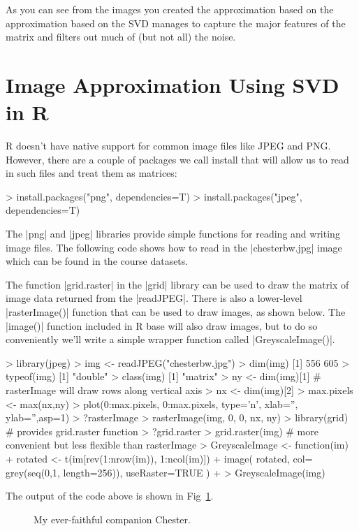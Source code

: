 As you can see from the images you created the approximation based on the approximation based on the SVD manages to capture the major features of the matrix and filters out much of (but not all) the noise.

\section{Image Approximation Using SVD in R}

R doesn't have native support for common image files like JPEG and PNG.  However, there are a couple of packages we call install that will allow us to read in such files and treat them as matrices:
%
\begin{R}
> install.packages("png", dependencies=T)
> install.packages("jpeg", dependencies=T)
\end{R}

The |png| and |jpeg| libraries provide simple functions for reading and writing image files.  The following code shows how to read in the |chesterbw.jpg| image which can be found in the course datasets. %


The function |grid.raster| in the |grid| library can be used to draw the matrix of image data returned from the |readJPEG|.  There is also a lower-level |rasterImage()| function that can be used to draw images, as shown below. The |image()| function included in R base will also draw images, but to do so conveniently we'll write a simple wrapper function called |GreyscaleImage()|.

%
\begin{R}
> library(jpeg)
> img <- readJPEG("chesterbw.jpg")
> dim(img)
[1] 556 605
> typeof(img)
[1] "double"
> class(img)
[1] "matrix"
> ny <- dim(img)[1]  # rasterImage will draw rows along vertical axis
> nx <- dim(img)[2]
> max.pixels <- max(nx,ny)
> plot(0:max.pixels, 0:max.pixels, type='n', xlab='', ylab='',asp=1)
> ?rasterImage
> rasterImage(img, 0, 0, nx, ny)
> library(grid) # provides grid.raster function
> ?grid.raster
> grid.raster(img)  # more convenient but less flexible than rasterImage
> GreyscaleImage <- function(im){
+    rotated <- t(im[rev(1:nrow(im)), 1:ncol(im)])
+    image( rotated, col= grey(seq(0,1, length=256)), useRaster=TRUE )
+ }
> GreyscaleImage(img)
\end{R}
The output of the code above is shown in Fig~\ref{fig:chester}.
\begin{figure}[ht!]
  \caption{My ever-faithful companion Chester.\label{fig:chester}}
\end{figure}


